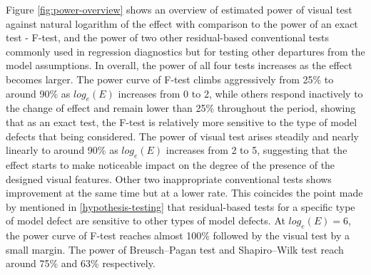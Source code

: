 \documentclass[]{interact}
\theoremstyle{plain}%
\theoremstyle{definition}
\theoremstyle{remark}
\begin{document}
Figure \ref{fig:power-overview} shows an overview of estimated power of
visual test against natural logarithm of the effect with comparison to
the power of an exact test - F-test, and the power of two other
residual-based conventional tests commonly used in regression
diagnostics but for testing other departures from the model assumptions.
In overall, the power of all four tests increases as the effect becomes
larger. The power curve of F-test climbs aggressively from 25\% to
around 90\% as \(log_e(E)\) increases from 0 to 2, while others respond
inactively to the change of effect and remain lower than 25\% throughout
the period, showing that as an exact test, the F-test is relatively more
sensitive to the type of model defects that being considered. The power
of visual test arises steadily and nearly linearly to around 90\% as
\(log_e(E)\) increases from 2 to 5, suggesting that the effect starts to
make noticeable impact on the degree of the presence of the designed
visual features. Other two inappropriate conventional tests shows
improvement at the same time but at a lower rate. This coincides the
point made by \citet{cook1982residuals} mentioned in
\ref{hypothesis-testing} that residual-based tests for a specific type
of model defect are sensitive to other types of model defects. At
\(log_e(E) = 6\), the power curve of F-test reaches almost 100\%
followed by the visual test by a small margin. The power of
Breusch--Pagan test and Shapiro--Wilk test reach around 75\% and 63\%
respectively.
\end{document}
